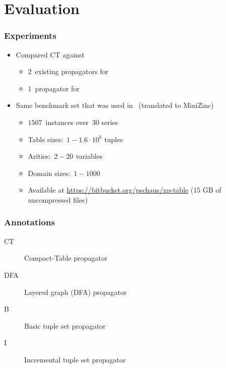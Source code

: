 \documentclass{beamer}
\newcommand{\Table}{\Constraint{Table}}
\newcommand{\CTpaper}[0]{DBLP:conf/cp/DemeulenaereHLP16}
\begin{document}
\section{Evaluation}

\begin{frame}
  \frametitle{Experiments}
  
  \begin{itemize}
    \item   Compared CT against
      \begin{itemize}
      \item $2$~existing propagators for \Table
      \item $1$~propagator for 
      \end{itemize} 
    \item Same benchmark set that was used in~\cite{\CTpaper}
      (translated to MiniZinc)
      \begin{itemize}
        \item $1507$~instances over~$30$ series 
        \item Table sizes:~$1-1.6 \cdot 10^6$ tuples
        \item Arities:~$2-20$ variables
        \item Domain sizes:~$1-1000$
        \item Available at \url{https://bitbucket.org/pschaus/xp-table}
          ($15$ GB of uncompressed files)
      \end{itemize}
      
  \end{itemize}
\end{frame}

\begin{frame}
  \frametitle{Annotations}
    \begin{description}
    \item[CT] Compact-Table propagator
    \item[DFA] Layered graph (DFA) propagator%
    \item[B] Basic tuple set propagator%
    \item[I] Incremental tuple set propagator
  \end{description}
\end{frame}
\end{document}
